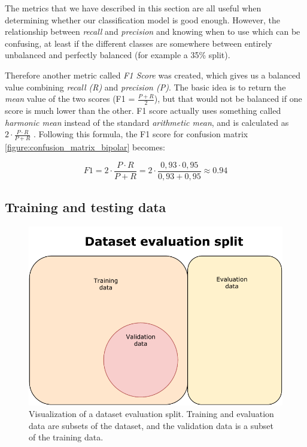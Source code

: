 The metrics that we have described in this section are all useful when determining whether our classification model is good enough. However, the relationship between \textit{recall} and \textit{precision} and knowing when to use which can be confusing, at least if the different classes are somewhere between entirely unbalanced and perfectly balanced (for example a 35\% split). 

Therefore another metric called \textit{F1 Score} was created, which gives us a balanced value combining \textit{recall (R)} and \textit{precision (P)}. The basic idea is to return the \textit{mean} value of the two scores (F1 = $ \frac{P + R}{2} $), but that would not be balanced if one score is much lower than the other. F1 score actually uses something called \textit{harmonic mean} instead of the standard \textit{arithmetic mean}, and is calculated as $ 2 \cdot \frac{P \cdot R}{P + R} $ \cite{ml_metrics}. 
Following this formula, the F1 score for confusion matrix \ref{figure:confusion_matrix_bipolar} becomes:

\[
  F1 = 2 \cdot \frac{P \cdot R}{P + R} = 2 \cdot \frac{0,93 \cdot 0,95}{0,93 + 0,95} \approx 0.94
\]

\subsection{Training and testing data}
\begin{figure}
  \includegraphics{img/train_test_data.pdf}
  \caption{Visualization of a dataset evaluation split. Training and evaluation data are subsets of the dataset, and the validation data is a subset of the training data.}
  \label{figure:dataset_train_test}
\end{figure}

